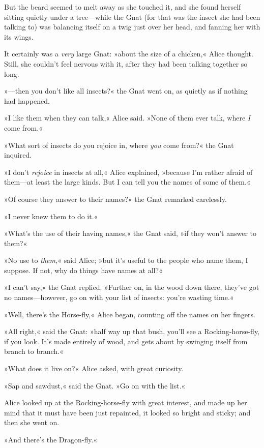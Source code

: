 But the beard seemed to melt away as she touched it, and she found herself sitting quietly under a tree—while the Gnat (for that was the insect she had been talking to) was balancing itself on a twig just over her head, and fanning her with its wings.

It certainly was a \textit{very} large Gnat: »about the size of a chicken,« Alice thought. Still, she couldn't feel nervous with it, after they had been talking together so long.

»—then you don't like all insects?« the Gnat went on, as quietly as if nothing had happened.

»I like them when they can talk,« Alice said. »None of them ever talk, where \textit{I} come from.«

»What sort of insects do you rejoice in, where \textit{you} come from?« the Gnat inquired.

»I don't \textit{rejoice} in insects at all,« Alice explained, »because I'm rather afraid of them—at least the large kinds. But I can tell you the names of some of them.«

»Of course they answer to their names?« the Gnat remarked carelessly.

»I never knew them to do it.«

»What's the use of their having names,« the Gnat said, »if they won't answer to them?«

»No use to \textit{them,}« said Alice; »but it's useful to the people who name them, I suppose. If not, why do things have names at all?«

»I can't say,« the Gnat replied. »Further on, in the wood down there, they've got no names—however, go on with your list of insects: you're wasting time.«

»Well, there's the Horse-fly,« Alice began, counting off the names on her fingers.

»All right,« said the Gnat: »half way up that bush, you'll see a Rocking-horse-fly, if you look. It's made entirely of wood, and gets about by swinging itself from branch to branch.«

»What does it live on?« Alice asked, with great curiosity.

»Sap and sawdust,« said the Gnat. »Go on with the list.«

Alice looked up at the Rocking-horse-fly with great interest, and made up her mind that it must have been just repainted, it looked so bright and sticky; and then she went on.

»And there's the Dragon-fly.«

